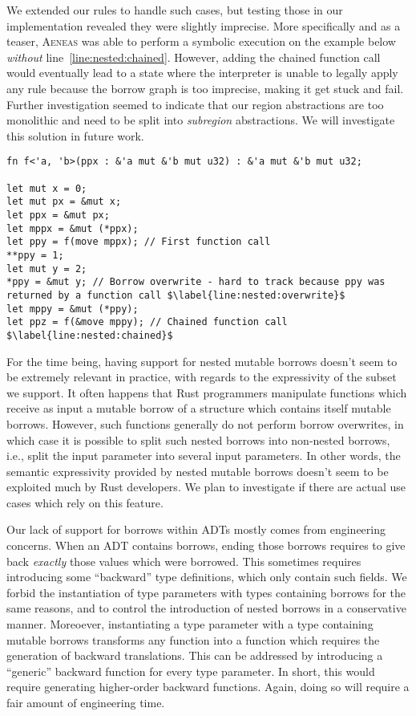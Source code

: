 \documentclass[acmsmall,screen]{acmart}
\newcommand{\aeneas}{\textsc{Aeneas}\xspace}
\begin{document}
We extended our rules to handle such cases, but testing those in our
implementation revealed they were slightly imprecise.
More specifically and as a teaser, \aeneas was able to perform a symbolic execution
on the example below \emph{without} line~\ref{line:nested:chained}. However,
adding the chained function call would eventually lead to a state where the interpreter is
unable to legally apply any rule because the borrow graph is too imprecise,
making it get stuck and fail.
Further investigation seemed to indicate that our region abstractions are
too monolithic and need to be split into \emph{subregion} abstractions.
We will investigate this solution in future work.


\begin{verbatim}
fn f<'a, 'b>(ppx : &'a mut &'b mut u32) : &'a mut &'b mut u32;

let mut x = 0;
let mut px = &mut x;
let ppx = &mut px;
let mppx = &mut (*ppx);
let ppy = f(move mppx); // First function call
**ppy = 1;
let mut y = 2;
*ppy = &mut y; // Borrow overwrite - hard to track because ppy was returned by a function call $\label{line:nested:overwrite}$
let mppy = &mut (*ppy);
let ppz = f(&move mppy); // Chained function call $\label{line:nested:chained}$
\end{verbatim}


For the time being, having support for nested mutable borrows doesn't seem to be
extremely relevant in practice, with regards to the expressivity of the subset we support.
It often happens that Rust programmers manipulate
functions which receive as input a mutable borrow of a structure which contains itself mutable borrows.
However, such functions generally do not perform borrow overwrites, in which case it is possible to
split such nested borrows into non-nested borrows, i.e., split the input parameter into several input parameters.
In other words, the semantic expressivity provided by nested mutable borrows doesn't seem to be exploited
much by Rust developers. We plan to investigate if there are actual use cases which rely on this feature.


Our lack of support for borrows within ADTs mostly comes from engineering concerns. When an ADT contains
borrows, ending those borrows requires to give back \emph{exactly} those values which were
borrowed. This sometimes requires introducing some ``backward'' type definitions, which only
contain such fields. We forbid the instantiation of type parameters with types containing borrows
for the same reasons, and to control the introduction of nested borrows in a conservative manner.
Moreoever, instantiating a type parameter with a type containing mutable borrows transforms
any function into a function which requires the generation of backward translations. This can be
addressed by introducing a ``generic'' backward function for every
type parameter. In short, this would require generating higher-order backward functions.
Again, doing so will require a fair amount of engineering time.
\end{document}
